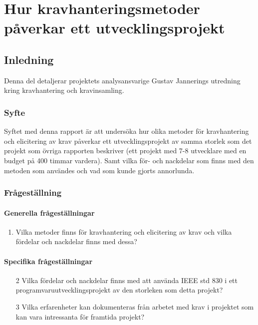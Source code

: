 \chapter{Hur kravhanteringsmetoder påverkar ett utvecklingsprojekt}
\label{cha:indiv-report-jannering}

\section{Inledning}
\label{sec:introduction-jannering}

Denna del detaljerar projektets analysansvarige Gustav Jannerings utredning kring kravhantering och kravinsamling.

\subsection{Syfte}
\label{sec:purpose-jannering}


Syftet med denna rapport är att undersöka hur olika metoder för kravhantering och elicitering av krav påverkar ett utvecklingsprojekt av samma storlek som det projekt som övriga rapporten beskriver (ett projekt med 7-8 utvecklare med en budget på 400 timmar vardera). Samt vilka för- och nackdelar som finns med den metoden som användes och vad som kunde gjorts annorlunda.

\subsection{Frågeställning}
\label{sec:issue-jannering}

\subsubsection{Generella frågeställningar}
\begin{enumerate}
	\item Vilka metoder finns för kravhantering och elicitering av krav och vilka fördelar och nackdelar finns med dessa? 
\end{enumerate}
\subsubsection{Specifika frågeställningar}
\begin{enumerate}
	\item [2] Vilka fördelar och nackdelar finns med att använda IEEE std 830 i ett programvaruutvecklingsprojekt av den storleken som detta projekt?
	
	\item [3] Vilka erfarenheter kan dokumenteras från arbetet med krav i projektet som kan vara intressanta för framtida projekt?
	
\end{enumerate}
